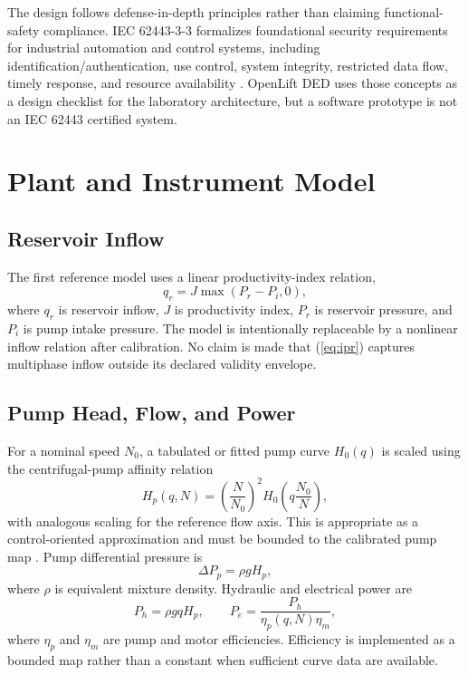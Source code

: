 \documentclass[conference]{IEEEtran}
\begin{document}
The design follows defense-in-depth principles rather than claiming functional-safety compliance. IEC 62443-3-3 formalizes foundational security requirements for industrial automation and control systems, including identification/authentication, use control, system integrity, restricted data flow, timely response, and resource availability \cite{iec62443}. OpenLift DED uses those concepts as a design checklist for the laboratory architecture, but a software prototype is not an IEC 62443 certified system.

\section{Plant and Instrument Model}
\subsection{Reservoir Inflow}
The first reference model uses a linear productivity-index relation,
\begin{equation}
q_r = J\max(P_r-P_i,0),
\label{eq:ipr}
\end{equation}
where $q_r$ is reservoir inflow, $J$ is productivity index, $P_r$ is reservoir pressure, and $P_i$ is pump intake pressure. The model is intentionally replaceable by a nonlinear inflow relation after calibration. No claim is made that (\ref{eq:ipr}) captures multiphase inflow outside its declared validity envelope.

\subsection{Pump Head, Flow, and Power}
For a nominal speed $N_0$, a tabulated or fitted pump curve $H_0(q)$ is scaled using the centrifugal-pump affinity relation
\begin{equation}
H_p(q,N)=\left(\frac{N}{N_0}\right)^2
H_0\!\left(q\frac{N_0}{N}\right),
\label{eq:affinity}
\end{equation}
with analogous scaling for the reference flow axis. This is appropriate as a control-oriented approximation and must be bounded to the calibrated pump map \cite{takacs2018}. Pump differential pressure is
\begin{equation}
\Delta P_p = \rho g H_p,
\label{eq:headpressure}
\end{equation}
where $\rho$ is equivalent mixture density. Hydraulic and electrical power are
\begin{equation}
P_h=\rho g q H_p, \qquad
P_e=\frac{P_h}{\eta_p(q,N)\eta_m},
\label{eq:power}
\end{equation}
where $\eta_p$ and $\eta_m$ are pump and motor efficiencies. Efficiency is implemented as a bounded map rather than a constant when sufficient curve data are available.
\end{document}
